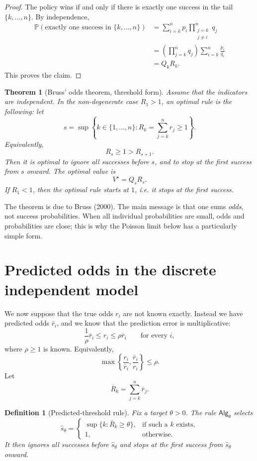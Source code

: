 \documentclass[11pt,a4paper]{article}
\newtheorem{theorem}{Theorem}
\newtheorem{definition}{Definition}
\newcommand{\alg}{\mathsf{Alg}}
\begin{document}
\begin{proof}
The policy wins if and only if there is exactly one success in the tail
\(\{k,\dots,n\}\).  By independence,
\begin{align*}
  \mathbb P(\text{exactly one success in }\{k,\dots,n\})
  &=\sum_{i=k}^n p_i\prod_{\substack{j=k\\j\ne i}}^n q_j \\
  &=\left(\prod_{j=k}^n q_j\right)
    \sum_{i=k}^n \frac{p_i}{q_i} \\
  &=Q_kR_k.
\end{align*}
This proves the claim.
\end{proof}

\begin{theorem}[Bruss' odds theorem, threshold form]
\label{thm:bruss}
Assume that the indicators are independent.  In the non-degenerate case
\(R_1>1\), an optimal rule is the following: let
\[
  s=\sup\left\{k\in\{1,
  \dots,n\}:R_k=\sum_{j=k}^n r_j\ge1\right\}.
\]
Equivalently,
\[
  R_s\ge1>R_{s+1}.
\]
Then it is optimal to ignore all successes before \(s\), and to stop at the
first success from \(s\) onward.  The optimal value is
\[
  V^\star=Q_sR_s.
\]
If \(R_1<1\), then the optimal rule starts at \(1\), i.e. it stops at the first
success.
\end{theorem}

The theorem is due to Bruss (2000).  The main message is that one
sums \emph{odds}, not success probabilities.  When all individual probabilities
are small, odds and probabilities are close; this is why the Poisson limit below
has a particularly simple form.

\section{Predicted odds in the discrete independent model}

We now suppose that the true odds \(r_i\) are not known exactly.  Instead we
have predicted odds \(\bar r_i\), and we know that the prediction error is
multiplicative:
\[
  \boxed{
  \frac1\rho\bar r_i\le r_i\le \rho\bar r_i
  }
  \qquad \text{for every }i,
  \tag{A}
\]
where \(\rho\ge1\) is known.  Equivalently,
\[
  \max\left\{\frac{r_i}{\bar r_i},\frac{\bar r_i}{r_i}\right\}\le\rho.
\]
Let
\[
  \bar R_k=\sum_{j=k}^n\bar r_j.
\]

\begin{definition}[Predicted-threshold rule]
\label{def:pred-rule}
Fix a target \(\theta>0\).  The rule \(\alg_\theta\) selects
\[
  \hat s_\theta=
  \begin{cases}
    \sup\{k:\bar R_k\ge \theta\}, & \text{if such a }k\text{ exists},\\
    1, & \text{otherwise}.
  \end{cases}
\]
It then ignores all successes before \(\hat s_\theta\) and stops at the first
success from \(\hat s_\theta\) onward.
\end{definition}
\end{document}
